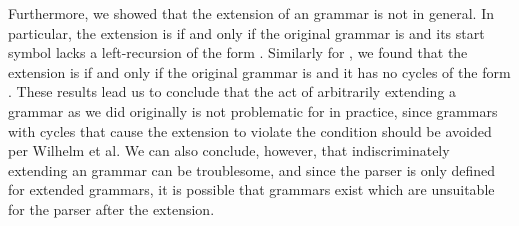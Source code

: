 \begin{isabellebody}
\begin{isamarkuptext}
Furthermore, we showed that the extension of an  grammar is not  in general. In
particular, the extension is  if and only if the original grammar  is  and its
start symbol  lacks a left-recursion of the form .
Similarly for , we found that the extension is  if and only if the original grammar 
is  and it has no cycles of the form .
These results lead us to conclude that the act of arbitrarily extending a grammar as we did originally is
not problematic for  in practice, since grammars with cycles that cause the extension to violate the
 condition should be avoided per Wilhelm et al. We can also conclude, however,
that indiscriminately extending an  grammar can be troublesome, and since the  parser
is only defined for extended grammars, it is possible that  grammars exist which are
unsuitable for the parser after the extension.


\end{isamarkuptext}
\end{isabellebody}
